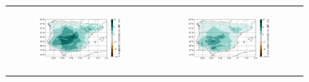 \begin{figure}[htbp]
\begin{tabular}{cc}
        \begin{subfigure}[b]{0.5\textwidth}
            \caption{}
            \includegraphics[width=\textwidth]{images/chap4/future/reldiffmap_q2m_futirr.png}
        \end{subfigure} &
        \begin{subfigure}[b]{0.5\textwidth}
            \caption{}
            \includegraphics[width=\textwidth]{images/chap4/future/reldiffmap_rh2m_futirr.png}
        \end{subfigure} \\


\end{tabular}
\end{figure}
